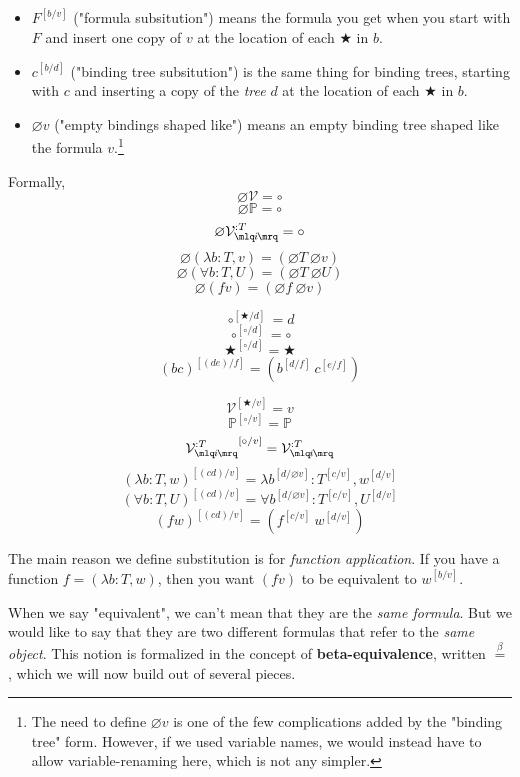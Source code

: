 \documentclass{article}
\newcommand{\Prop}{\mathbb{P}}
\newcommand{\usage}{\mathcal{V}}
\newcommand{\usageKnown}[2]{{\usage_{\mlq\hspace{-0.06em}#2\hspace{-0.06em}\mrq}^{:#1}}}
\newcommand{\subst}[3]{#1^{[{#2}{/}{#3}]}}
\newcommand{\bindvariable}{\bigstar}
\newcommand{\bindnotthis}{\circ}
\newcommand{\emptybindingslike}[1]{\varnothing #1}
\newcommand{\betaeq}{\overset{\beta}{=}}
\begin{document}
  \begin{itemize}
  \item $\subst{F}{b}{v}$ ("formula subsitution") means the formula you get when you start with $F$ and insert one copy of $v$ at the location of each $\bindvariable$ in $b$.
  \item $\subst{c}{b}{d}$ ("binding tree subsitution") is the same thing for binding trees, starting with $c$ and inserting a copy of the \emph{tree} $d$ at the location of each $\bindvariable$ in $b$.
  \item $\emptybindingslike{v}$ ("empty bindings shaped like") means an empty binding tree shaped like the formula $v$.\footnote{The need to define $\emptybindingslike{v}$ is one of the few complications added by the "binding tree" form. However, if we used variable names, we would instead have to allow variable-renaming here, which is not any simpler.}
  \end{itemize}
  
  
  
  Formally,  
  \[\emptybindingslike{\usage} = \bindnotthis\]
  \[\emptybindingslike{\Prop} = \bindnotthis\]
  \[\emptybindingslike{\usageKnown{T}{i}} = \bindnotthis\]
  \[\emptybindingslike{(\lambda b:T,v)} = (\emptybindingslike{T}\ \emptybindingslike{v})\]
  \[\emptybindingslike{(\forall b:T,U)} = (\emptybindingslike{T}\ \emptybindingslike{U})\]
  \[\emptybindingslike{(f v)} = (\emptybindingslike{f}\ \emptybindingslike{v})\]
    
  \[\subst{\bindnotthis}{\bindvariable}{d} = d\]
  \[\subst{\bindnotthis}{\bindnotthis}{d} = \bindnotthis\]
  \[\subst{\bindvariable}{\bindnotthis}{d} = \bindvariable\]
  \[\subst{(bc)}{(de)}{f} = (\subst{b}{d}{f}\ \subst{c}{e}{f})\]
  
  \[\subst{\usage}{\bindvariable}{v} = v\]
  \[\subst{\Prop}{\bindnotthis}{v} = \Prop\]
  \[\subst{\usageKnown{T}{i}}{\bindnotthis}{v} = \usageKnown{T}{i}\]
  \[\subst{(\lambda b:T,w)}{(cd)}{v} = \lambda \subst{b}{d}{\emptybindingslike{v}}:\subst{T}{c}{v},\subst{w}{d}{v}\]
  \[\subst{(\forall b:T,U)}{(cd)}{v} = \forall \subst{b}{d}{\emptybindingslike{v}}:\subst{T}{c}{v},\subst{U}{d}{v}\]
  \[\subst{(f w)}{(cd)}{v} = (\subst{f}{c}{v}\ \subst{w}{d}{v})\]

The main reason we define substitution is for \emph{function application}. If you have a function $f =(\lambda b:T,w)$, then you want $(f v)$ to be equivalent to $\subst{w}{b}{v}$.

When we say "equivalent", we can't mean that they are the \emph{same formula}. But we would like to say that they are two different formulas that refer to the \emph{same object}. This notion is formalized in the concept of \textbf{beta-equivalence}, written $\betaeq$, which we will now build out of several pieces.
\end{document}

